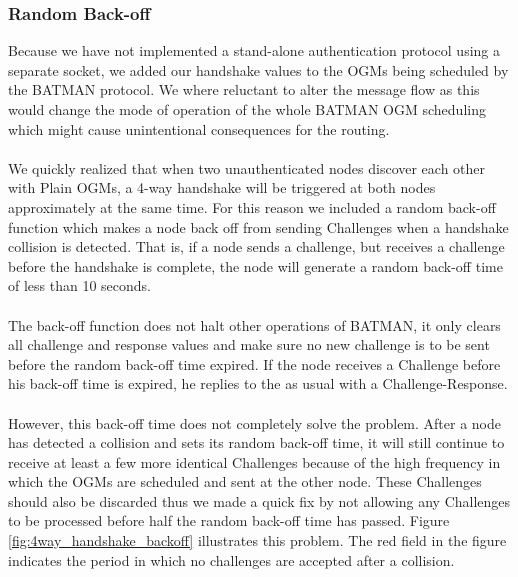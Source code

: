 \subsubsection*{Random Back-off}
Because we have not implemented a stand-alone authentication protocol using a separate socket, we added our handshake values to the OGMs being scheduled by the BATMAN protocol. We where reluctant to alter the message flow as this would change the mode of operation of the whole BATMAN OGM scheduling which might cause unintentional consequences for the routing.
\\\\
We quickly realized that when two unauthenticated nodes discover each other with Plain OGMs, a 4-way handshake will be triggered at both nodes approximately at the same time. For this reason we included a random back-off function which makes a node back off from sending Challenges when a handshake collision is detected. That is, if a node sends a challenge, but receives a challenge before the handshake is complete, the node will generate a random back-off time of less than 10 seconds.
\\\\
The back-off function does not halt other operations of BATMAN, it only clears all challenge and response values and make sure no new challenge is to be sent before the random back-off time expired. If the node receives a Challenge before his back-off time is expired, he replies to the as usual with a Challenge-Response.
\\\\
However, this back-off time does not completely solve the problem. After a node has detected a collision and sets its random back-off time, it will still continue to receive at least a few more identical Challenges because of the high frequency in which the OGMs are scheduled and sent at the other node. These Challenges should also be discarded thus we made a quick fix by not allowing any Challenges to be processed before half the random back-off time has passed. Figure \ref{fig:4way_handshake_backoff} illustrates this problem. The red field in the figure indicates the period in which no challenges are accepted after a collision.

